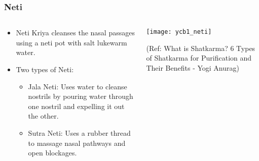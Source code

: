 \begin{frame}[fragile]\frametitle{Neti}
\begin{columns}
    \begin{column}[T]{0.5\linewidth}
      \begin{itemize}
          \item Neti Kriya cleanses the nasal passages using a neti pot with salt lukewarm water.
          \item Two types of Neti:
            \begin{itemize}
              \item Jala Neti: Uses water to cleanse nostrils by pouring water through one nostril and expelling it out the other.
              \item Sutra Neti: Uses a rubber thread to massage nasal pathways and open blockages.
            \end{itemize}
      \end{itemize}
    \end{column}
    \begin{column}[T]{0.5\linewidth}
        \begin{center}
        \texttt{[image: ycb1\_neti]}
		
		{\tiny (Ref: What is Shatkarma? 6 Types of Shatkarma for Purification and Their Benefits - Yogi Anurag)}	
        \end{center}	
    \end{column}
\end{columns}
\end{frame}

